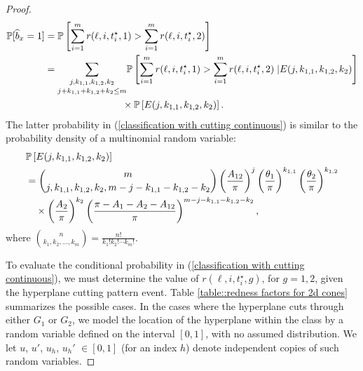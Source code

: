 \documentclass[twoside,11pt]{article}
\newcommand{\edit}[1]{{{#1}}}
\begin{document}
\begin{proof}
{\small
\begin{align}
\mathbb{P}[\widehat{b}_x = 1] &= \mathbb{P}\left[\sum_{i=1}^m r(\ell,i,t_i^\star,1) > \sum_{i=1}^m r(\ell,i,t_i^\star,2)\right] \notag\\
&= \underset{j+k_{1,1}+k_{1,2}+k_2\leq m}{\sum_{j,k_{1,1}, k_{1,2},k_2 } }%
\mathbb{P}\left[\sum_{i=1}^m r(\ell,i,t^\star_i,1) > \sum_{i=1}^m r(\ell,i,t^\star_i,2) \;| E( j,k_{1,1},k_{1,2},k_2 )
\right]\notag\\
&\qquad\qquad\qquad\qquad\times \mathbb{P}\left[%
E( j,k_{1,1},k_{1,2},k_2 )
\right]. \label{classification with cutting continuous}
\end{align}}
 The latter probability in (\ref{classification with cutting continuous}) is similar to the probability density of a multinomial random variable:
\begin{align}
&\mathbb{P}\left[E( j,k_{1,1},k_{1,2},k_2 )%
\right] \notag \\
&= \binom{m}{j,k_{1,1},k_{1,2},k_2,m-j-k_{1,1}-k_{1,2}-k_2} \left(\frac{A_{12}}{\pi}\right)^j \left(\frac{\theta_1}{\pi} \right)^{k_{1,1}} \left(\frac{\theta_2}{\pi} \right)^{k_{1,2}} \notag \\
&\quad\times \left(\frac{A_2}{\pi} \right)^{k_2} \left(\frac{\pi-A_1-A_2-A_{12}}{\pi}\right)^{m-j-k_{1,1}-k_{1,2}-k_2}, \label{multinomial probability}
\end{align}
where $\binom{n}{k_1,k_2,\dots,k_m} = \frac{n!}{k_1!k_2!\cdots k_m!}$. 




To evaluate the conditional probability in (\ref{classification with cutting continuous}), we must determine the value of $r(\ell,i,t_i^\star,g)$, for $g=1,2$, given the hyperplane cutting pattern event. Table \ref{table::redness factors for 2d cones} summarizes the possible cases. \edit{In the cases where the hyperplane cuts through either $G_1$ or $G_2$, we model the location of the hyperplane within the class by a random variable defined on the interval $[0,1]$, with no assumed distribution. We let $u$, $u'$, $u_h$, $u_h'$ $\in [0,1]$ (for an index $h$) denote independent copies of such random variables.}


\end{proof}
\end{document}
